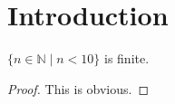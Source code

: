 %

\section{Introduction}

\begin{lemma}[Smale 1958]
  \label{lem:finite_test}
  \leanok
  $\{ n \in \mathbb{N} \mid n < 10 \}$ is finite.
\end{lemma}
  
\begin{proof}
  \leanok
  This is obvious.
\end{proof}